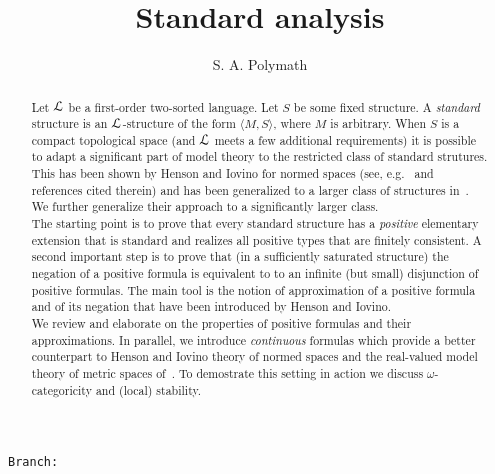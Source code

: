 \documentclass{amsproc}
\author{S. A. Polymath}
\newcommand\branch{}
\begin{document}
\title{Standard analysis}
\hfill\texttt{Branch:\ \branch\ \DTMnow}\bigskip
\maketitle
\raggedbottom

\begin{abstract}
  Let ${\EuScript L}$ be a first-order two-sorted language.
  Let $S$ be some fixed structure.
  A \textit{standard\/} structure is an ${\EuScript L}$-structure of the form $\langle M,S\rangle$, where $M$ is arbitrary.
  When $S$ is a compact topological space (and ${\EuScript L}$ meets a few additional requirements) it is possible to adapt a significant part of model theory to the restricted class of standard strutures.
  This has been shown by Henson and Iovino for normed spaces (see, e.g.~\cite{HI} and references cited therein) and has been generalized to a larger class of structures in~\cite{clcl}.
  We further generalize their approach to a significantly larger class.\\[1ex]
  \noindent
  The starting point is to prove that every standard structure has a \textit{positive\/} elementary extension that is standard and realizes all positive types that are finitely consistent.
  A second important step is to prove that (in a sufficiently saturated structure) the negation of a positive formula is equivalent to to an infinite (but small) disjunction of positive formulas.
  The main tool is the notion of approximation of a positive formula and of its negation that have been introduced by Henson and Iovino.\\[1ex]
  \noindent
  We review and elaborate on the properties of positive formulas and their approximations.
  In parallel, we introduce \textit{continuous\/} formulas which provide a better counterpart to Henson and Iovino theory of normed spaces and the real-valued model theory of metric spaces of~\cite{BBHU}.
  To demostrate this setting in action we discuss $\omega$-categoricity and (local) stability.
\end{abstract}

\end{document}
